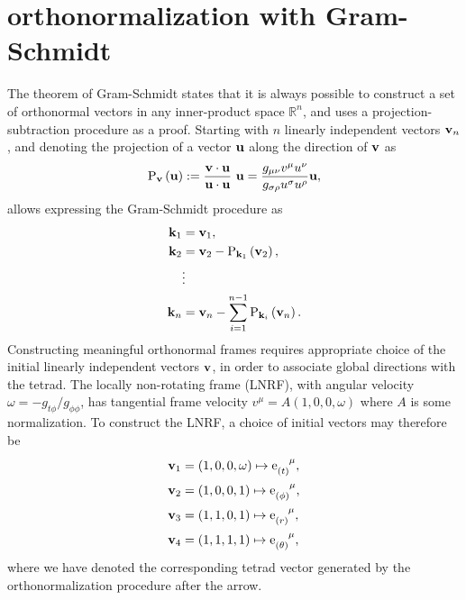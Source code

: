 \section{orthonormalization with Gram-Schmidt}
\label{appendix:gram-schmidt}

The theorem of Gram-Schmidt states that it is always possible to construct a set of orthonormal vectors in any inner-product space $\mathbb{R}^n$, and uses a projection-subtraction procedure as a proof. Starting with $n$ linearly independent vectors $\mathbf{v}_n$, and denoting the projection of a vector $\mathbf{u}$ along the direction of $\mathbf{v}$ as
\begin{equation}
\mathrm{P}_{\vector{v}}\left(\vector{u}\right) := \frac{\vector{v} \cdot \vector{u}}{\vector{u} \cdot \vector{u}}\ \vector{u} = \frac{g_{\mu\nu} v^\mu u^\nu}{g_{\sigma\rho} u^\sigma u^\rho} \vector{u},
\end{equation}
allows expressing the Gram-Schmidt procedure as
\begin{align}
    \mathbf{k}_1 &= \mathbf{v}_1, \nonumber \\
    \mathbf{k}_2 &= \mathbf{v}_2 - \mathrm{P}_{\mathbf{k}_1}\left(\mathbf{v}_2 \right), \nonumber \\
    &\vdots \nonumber \\
    \mathbf{k}_n &= \mathbf{v}_n - \sum_{i = 1}^{n-1} \mathrm{P}_{\mathbf{k}_i} \left(\mathbf{v}_n \right).
\end{align}
Constructing meaningful orthonormal frames requires appropriate choice of the initial linearly independent vectors $\mathbf{v}$, in order to associate global directions with the tetrad. The locally non-rotating frame (LNRF), with angular velocity $\omega = -g_{t\phi} / g_{\phi\phi}$, has tangential frame velocity $v^\mu = A (1, 0, 0, \omega)$ where $A$ is some normalization. To construct the LNRF, a choice of initial vectors may therefore be
\begin{align}
    \vector{v}_1 &= \left(1, 0, 0, \omega \right) \mapsto \dtensor{\e}{(t)}{\mu}, \nonumber \\
    \vector{v}_2 &= \left(1, 0, 0, 1\right) \mapsto \dtensor{\e}{(\phi)}{\mu}, \nonumber \\
    \vector{v}_3 &= \left(1, 1, 0, 1\right) \mapsto \dtensor{\e}{(r)}{\mu}, \nonumber \\
    \vector{v}_4 &= \left(1, 1, 1, 1\right) \mapsto \dtensor{\e}{(\theta)}{\mu},
\end{align}
where we have denoted the corresponding tetrad vector generated by the orthonormalization procedure after the arrow.

